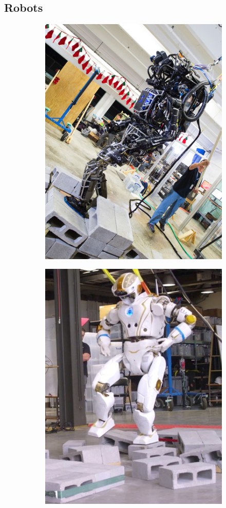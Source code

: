 \subsection{Robots}
\begin{figure}[h]
\centering
  \begin{subfigure}{0.45\textwidth}
  \centering
  \includegraphics[width=.8\linewidth]{STYLESTUFF/AtlasOld.png}
   \caption{}
    \label{fig:atlas}
  \end{subfigure}
  \begin{subfigure}{0.45\textwidth}
    \centering
  \includegraphics[width=.8\linewidth]{STYLESTUFF/Valkyrie.jpeg}

\end{subfigure}
\end{figure}
